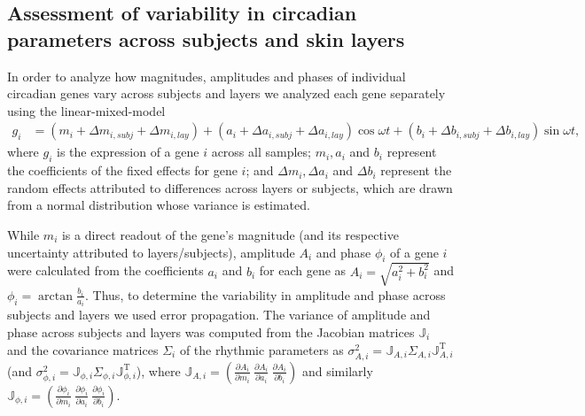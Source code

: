\subsection*{Assessment of variability in circadian parameters across subjects and skin layers}
In order to analyze how magnitudes, amplitudes and phases of individual circadian genes vary across subjects and layers we analyzed each gene separately using the linear-mixed-model \cite{Bates2015, Laird1982, Hoffman2016}
\begin{equation*}
\begin{split}
g_i &= (m_i + \Delta m_{i,subj} + \Delta m_{i,lay}) + (a_i + \Delta a_{i,subj} + \Delta a_{i,lay}) \cos \omega t + (b_i + \Delta b_{i,subj} + \Delta b_{i,lay}) \sin \omega t,
\end{split}
\end{equation*}
where $g_i$ is the expression of a gene $i$ across all samples; $m_i, a_i$ and $b_i$ represent the coefficients of the fixed effects for gene $i$; and $\Delta m_{i}, \Delta a_{i}$ and $\Delta b_{i}$ represent the random effects attributed to differences across layers or subjects, which are drawn from a normal distribution whose variance is estimated. 

While $m_i$ is a direct readout of the gene's magnitude (and its respective uncertainty attributed to layers/subjects), amplitude $A_i$ and phase $\phi_i$ of a gene $i$ were calculated from the coefficients $a_i$ and $b_i$ for each gene as $A_i=\sqrt{a_i^2 + b_i^2}$ and $\phi_i=\arctan\frac{b_i}{a_i}$. Thus, to determine the variability in amplitude and phase across subjects and layers we used error propagation. The variance of amplitude and phase across subjects and layers was computed from the Jacobian matrices $\mathbb{J}_i$ and the covariance matrices $\Sigma_i$ of the rhythmic parameters as $\sigma^2_{A,i} = \mathbb{J}_{A,i} \Sigma_{A,i} \mathbb{J}_{A,i}^\mathrm{T}$ (and  $\sigma^2_{\phi,i} = \mathbb{J}_{\phi,i} \Sigma_{\phi,i} \mathbb{J}_{\phi,i}^\mathrm{T}$), where $\mathbb{J}_{A,i}=\left( \frac{\partial A_i}{\partial m_i} \  \frac{\partial A_i}{\partial a_i} \  \frac{\partial A_i}{\partial b_i} \right)$ and similarly $\mathbb{J}_{\phi,i}=\left( \frac{\partial \phi_i}{\partial m_i} \  \frac{\partial \phi_i}{\partial a_i} \  \frac{\partial \phi_i}{\partial b_i} \right)$. 


